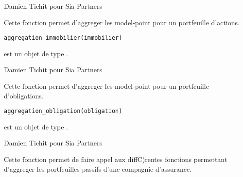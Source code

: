 \documentclass[a4paper]{book}
\begin{document}
%
\begin{Author}\relax
Damien Tichit pour Sia Partners
\end{Author}
%
\begin{Description}\relax
Cette fonction permet d'aggreger les model-point pour un portfeuille d'actions.
\end{Description}
%
\begin{Usage}
\begin{verbatim}
aggregation_immobilier(immobilier)
\end{verbatim}
\end{Usage}
%
\begin{Arguments}
\begin{ldescription}
\item[\code{immobilier}] est un objet de type .
\end{ldescription}
\end{Arguments}
%
\begin{Author}\relax
Damien Tichit pour Sia Partners
\end{Author}
%
\begin{Description}\relax
Cette fonction permet d'aggreger les model-point pour un portfeuille d'obligations.
\end{Description}
%
\begin{Usage}
\begin{verbatim}
aggregation_obligation(obligation)
\end{verbatim}
\end{Usage}
%
\begin{Arguments}
\begin{ldescription}
\item[\code{obligation}] est un objet de type .
\end{ldescription}
\end{Arguments}
%
\begin{Author}\relax
Damien Tichit pour Sia Partners
\end{Author}
%
\begin{Description}\relax
Cette fonction permet de faire appel aux diffC)rentes fonctions permettant d'aggreger les portfeuilles passifs d'une compagnie d'assurance.
\end{Description}
\end{document}
